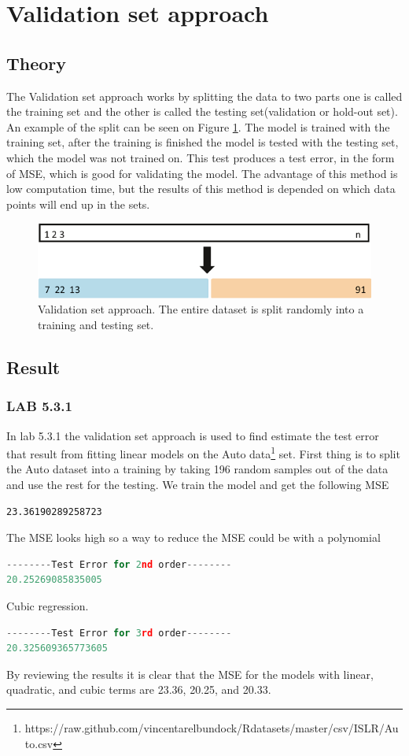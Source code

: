 
\section{Validation set approach}
\subsection{Theory}
The Validation set approach works by splitting the data to two parts one is called the training set and the other is called the testing set(validation or hold-out set). An example of the split can be seen on Figure \ref{fig:validationsetapproach}. The model is trained with the training set, after the training is finished the model is tested with the testing set, which the model was not trained on. This test produces a test error, in the form of MSE, which is good for validating the model. The advantage of this method is low computation time, but the results of this method is depended on which data points will end up in the sets. 
\begin{figure}[H]
	\centering
	\includegraphics[width=0.4\linewidth]{crossValidation/validationSetApproach}
	\caption{Validation set approach. The entire dataset is split randomly into a training and testing set.}
	\label{fig:validationsetapproach}
\end{figure}

\subsection{Result}
\subsubsection*{LAB 5.3.1}%
In lab 5.3.1 the validation set approach is used to find estimate the test error that result from fitting linear models on the Auto data\footnote{https://raw.github.com/vincentarelbundock/Rdatasets/master/csv/ISLR/Auto.csv} set. First thing is to split the Auto dataset into a training by taking 196 random samples out of the data and use the rest for the testing. We train the model and get the following MSE
\begin{lstlisting}
23.36190289258723
\end{lstlisting}
The MSE looks high so a way to reduce the MSE could be with a polynomial 
\begin{lstlisting}[language=Python]
--------Test Error for 2nd order--------
20.25269085835005
\end{lstlisting}
Cubic regression.
\begin{lstlisting}[language=Python]
--------Test Error for 3rd order--------
20.325609365773605
\end{lstlisting}
By reviewing the results it is clear that the MSE for the models with linear, quadratic, and cubic terms are 23.36, 20.25, and 20.33.

